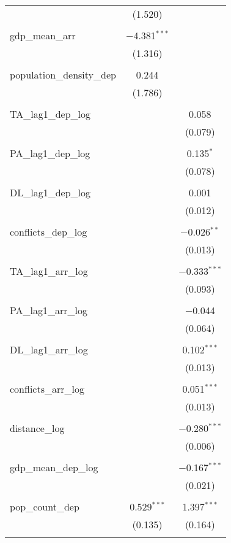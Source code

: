 \begin{table}[!htbp]
\begin{tabular}{@{\extracolsep{5pt}}lcc}
  & (1.520) &  \\ 
  & & \\ 
 gdp\_mean\_arr & $-$4.381$^{***}$ &  \\ 
  & (1.316) &  \\ 
  & & \\ 
 population\_density\_dep & 0.244 &  \\ 
  & (1.786) &  \\ 
  & & \\ 
 TA\_lag1\_dep\_log &  & 0.058 \\ 
  &  & (0.079) \\ 
  & & \\ 
 PA\_lag1\_dep\_log &  & 0.135$^{*}$ \\ 
  &  & (0.078) \\ 
  & & \\ 
 DL\_lag1\_dep\_log &  & 0.001 \\ 
  &  & (0.012) \\ 
  & & \\ 
 conflicts\_dep\_log &  & $-$0.026$^{**}$ \\ 
  &  & (0.013) \\ 
  & & \\ 
 TA\_lag1\_arr\_log &  & $-$0.333$^{***}$ \\ 
  &  & (0.093) \\ 
  & & \\ 
 PA\_lag1\_arr\_log &  & $-$0.044 \\ 
  &  & (0.064) \\ 
  & & \\ 
 DL\_lag1\_arr\_log &  & 0.102$^{***}$ \\ 
  &  & (0.013) \\ 
  & & \\ 
 conflicts\_arr\_log &  & 0.051$^{***}$ \\ 
  &  & (0.013) \\ 
  & & \\ 
 distance\_log &  & $-$0.280$^{***}$ \\ 
  &  & (0.006) \\ 
  & & \\ 
 gdp\_mean\_dep\_log &  & $-$0.167$^{***}$ \\ 
  &  & (0.021) \\ 
  & & \\ 
 pop\_count\_dep & 0.529$^{***}$ & 1.397$^{***}$ \\ 
  & (0.135) & (0.164) \\ 
  & & \\ 

\end{tabular}
\end{table}

